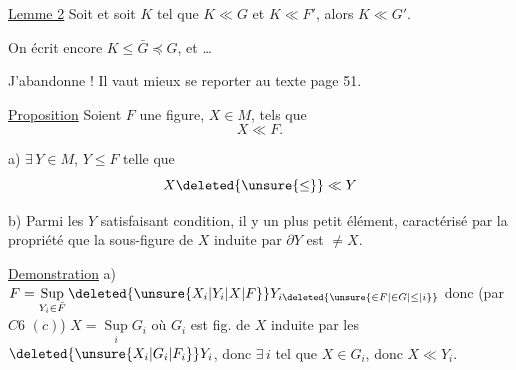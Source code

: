 
\uline{Lemme 2} Soit
et soit $K$ tel que $K\ll G$ et $K\ll F'$, alors $K\ll G'$.

On écrit encore $K\leq\bar G\preceq G$, et \ldots

 J'abandonne ! Il vaut mieux se reporter au texte page 51.




\uline{Proposition} Soient $F$ une figure, $X\in M$, tels que
\[
 X\ll F.
\]

a)  $\exists\,Y\in M$, $Y\leq F$ telle que
\[
 X\deleted{\unsure{\leq}}\ll Y
\]

b) Parmi les $Y$ satisfaisant  condition, il y un plus petit élément,     caractérisé par la propriété que la sous-figure de $X$ induite par $\partial Y$ est $\neq X$.

\uline{Demonstration} a) $F=\mathop{\mathrm{Sup}}\limits_{Y_i\in\bar F}\deleted{\unsure{X_i|Y_i|X|F}}Y_{i\deleted{\unsure{\in F|\in G|\leq|i}}}$ donc  (par $C6$ $(c)$) $X=\mathop{\mathrm{Sup}}\limits_{i}G_i$ où $G_i$ est   fig. de $X$ induite par les $\deleted{\unsure{X_i|G_i|F_i}}Y_i$, donc $\exists\,i$ tel que $X\in G_i$, donc $X\ll Y_i$.
